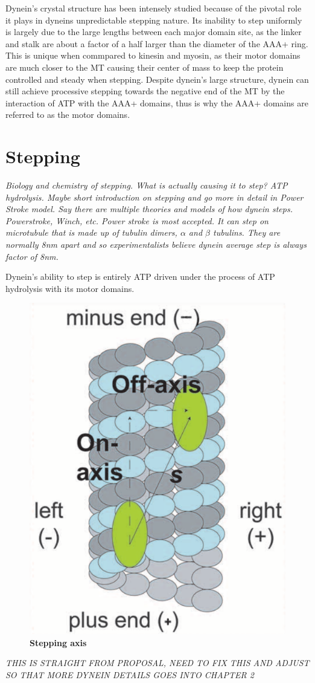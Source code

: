 Dynein's crystal structure has been intensely studied because of the pivotal role it plays in dyneins unpredictable stepping nature. Its inability to step uniformly is largely due to the large lengths between each major domain site, as the linker and stalk are about a factor of a half larger than the diameter of the AAA+ ring. This is unique when commpared to kinesin and myosin, as their motor domains are much closer to the MT causing their center of mass to keep the protein controlled and steady when stepping. Despite dynein's large structure, dynein can still achieve processive stepping towards the negative end of the MT by the interaction of ATP with the AAA+ domains, thus is why the AAA+ domains are referred to as the motor domains.





\section{Stepping}
\textit{Biology and chemistry of stepping. What is actually causing it to step? ATP hydrolysis. Maybe short introduction on stepping and go more in detail in Power Stroke model. Say there are multiple theories and models of how dynein steps. Powerstroke, Winch, etc. Power stroke is most accepted. It can step on microtubule that is made up of tubulin dimers, $\alpha$ and $\beta$ tubulins. They are normally 8nm apart and so experimentalists believe dynein average step is always factor of 8nm. }

Dynein's ability to step is entirely ATP driven under the process of ATP hydrolysis with its motor domains. 

\begin{figure}[H]
	\centering
	\includegraphics[width=0.3\columnwidth]{Figures/Onaxis.png}
	\caption[Stepping Axis]{\textbf{Stepping axis}  \cite{Dewitt2012} }
	\label{fig:YildizCorrelation}
\end{figure}

\textit{THIS IS STRAIGHT FROM PROPOSAL, NEED TO FIX THIS AND ADJUST SO THAT MORE DYNEIN DETAILS GOES INTO CHAPTER 2}

